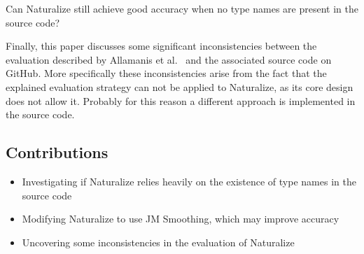 \begin{resquest} \label{hyp:typeommitance}
Can Naturalize still achieve good accuracy when no type names are present in the source code?
\end{resquest}

Finally, this paper discusses some significant inconsistencies between the evaluation described by Allamanis et al.~\cite{naturalize} and the associated source code on GitHub. More specifically these inconsistencies arise from the fact that the explained evaluation strategy can not be applied to Naturalize, as its core design does not allow it. Probably for this reason a different approach is implemented in the source code.

\subsection*{Contributions}
\begin{itemize}
    \item Investigating if Naturalize relies heavily on the existence of type names in the source code
    \item Modifying Naturalize to use JM Smoothing, which may improve accuracy
    \item Uncovering some inconsistencies in the evaluation of Naturalize
\end{itemize}